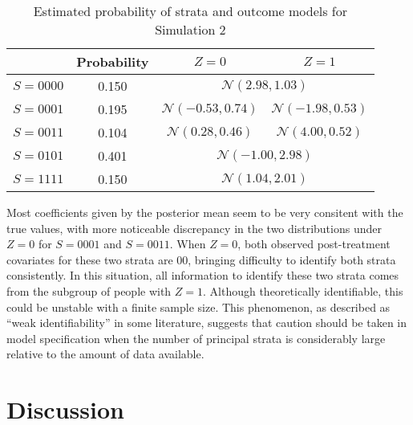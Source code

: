 \documentclass{article}
\begin{document}
\begin{table}[h]
  \centering
  \begin{tabular}{cccc}
    \toprule
    & Probability & $Z = 0$ & $Z = 1$ \\
    \midrule
    $S = 0000$ & 0.150 & \multicolumn{2}{c}{$\mathcal{N}(2.98,1.03)$} \\
    $S = 0001$ & 0.195& $\mathcal{N}(-0.53, 0.74)$ & $\mathcal{N}(-1.98, 0.53)$ \\
    $S = 0011$ & 0.104 & $\mathcal{N}(0.28, 0.46)$ & $\mathcal{N}(4.00, 0.52)$ \\
    $S = 0101$ & 0.401 & \multicolumn{2}{c}{$\mathcal{N}(-1.00, 2.98)$} \\
    $S = 1111$ & 0.150 & \multicolumn{2}{c}{$\mathcal{N}(1.04, 2.01)$} \\
    \bottomrule
  \end{tabular}
  \caption{Estimated probability of strata and outcome models for Simulation 2}
  \label{tbl::sim2}
\end{table}
Most coefficients given by the posterior mean seem to be very consitent with the true values, with more noticeable discrepancy in the two distributions under $Z = 0$ for $S = 0001$ and $S = 0011$. When $Z = 0$, both observed post-treatment covariates for these two strata are $00$, bringing difficulty to identify both strata consistently. In this situation, all information to identify these two strata comes from the subgroup of people with $Z = 1$. Although theoretically identifiable, this could be unstable with a finite sample size. This phenomenon, as described as ``weak identifiability'' in some literature, suggests that caution should be taken in model specification when the number of principal strata is considerably large relative to the amount of data available.

\section{Discussion}
\end{document}
